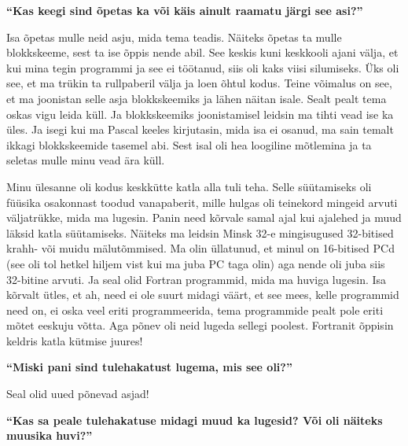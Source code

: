 \textbf{\enquote{Kas keegi sind õpetas ka või käis ainult raamatu järgi see asi?}}

Isa õpetas mulle neid asju, mida tema teadis. Näiteks õpetas ta mulle blokkskeeme, sest ta ise õppis nende abil. See keskis kuni keskkooli ajani välja, et kui mina tegin programmi ja see ei töötanud, siis oli kaks viisi silumiseks. Üks oli see, et ma trükin ta rullpaberil välja ja loen õhtul kodus. Teine võimalus on see, et ma joonistan selle asja blokkskeemiks ja lähen näitan isale. Sealt pealt tema oskas vigu leida küll. Ja blokkskeemiks joonistamisel leidsin ma tihti vead ise ka üles. Ja isegi kui ma Pascal keeles kirjutasin, mida isa ei osanud, ma sain temalt ikkagi blokkskeemide tasemel abi. Sest isal oli hea loogiline mõtlemina ja ta seletas mulle minu vead ära küll. 

Minu ülesanne oli kodus keskkütte katla alla tuli teha. Selle süütamiseks oli füüsika osakonnast toodud vanapaberit, mille hulgas oli teinekord mingeid arvuti väljatrükke, mida ma lugesin. Panin need kõrvale samal ajal kui ajalehed ja muud läksid katla süütamiseks. Näiteks ma leidsin Minsk 32-e mingisugused 32-bitised krahh- või muidu mälutõmmised. Ma olin üllatunud, et minul on 16-bitised PCd (see oli tol hetkel hiljem vist kui ma juba PC taga olin) aga nende oli juba siis 32-bitine arvuti. Ja seal olid Fortran programmid, mida ma huviga lugesin. Isa kõrvalt ütles, et ah, need ei ole suurt midagi väärt, et see mees, kelle programmid need on, ei oska veel eriti programmeerida, tema programmide pealt pole eriti mõtet eeskuju võtta. Aga põnev oli neid lugeda sellegi poolest. Fortranit õppisin keldris katla kütmise juures!

\textbf{\enquote{Miski pani sind tulehakatust lugema, mis see oli?}}

Seal olid uued põnevad asjad!

\textbf{\enquote{Kas sa peale tulehakatuse midagi muud ka lugesid? Või oli näiteks muusika huvi?}}

